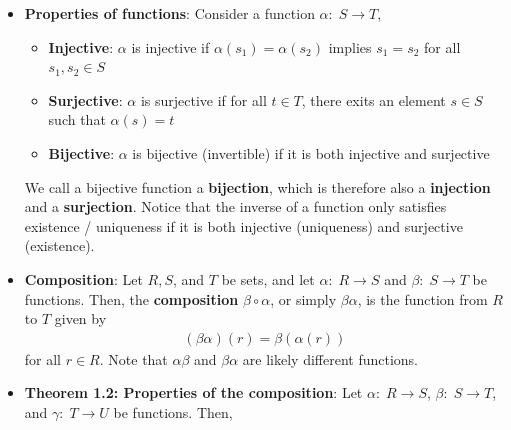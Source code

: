 \documentclass{report}
\begin{document}
\begin{itemize}
\begin{enumerate}
                    \begin{align*}
                        \forall a \in A,\; \exists b \in B \; : \; (a,b) \in f
                    .\end{align*}
                \item \textbf{Uniqueness / well-definedness}: Each input in $A$ has exactly one output in $B$
                    \begin{align*}
                        \forall a \in A,\; \forall b_{1}, b_{2} \in B,\; ((a,b_{1}) \in f \land (a,b_{2}) \in f) \implies b_{1} = b_{2}
                    .\end{align*}
            \end{enumerate}
        \item \textbf{Properties of functions}: Consider a function $\alpha:\; S \to T$, 
            \begin{itemize}
                \item \textbf{Injective}: $\alpha$ is injective if $\alpha(s_{1}) = \alpha(s_{2}) $ implies $s_{1} = s_{2} $ for all $s_{1}, s_{2} \in S $
                \item \textbf{Surjective}: $\alpha$ is surjective if for all $t \in T$, there exits an element $s \in S$ such that $\alpha(s) = t $
                \item \textbf{Bijective}: $\alpha$ is bijective (invertible) if it is both injective and surjective
            \end{itemize}
            We call a bijective function a \textbf{bijection}, which is therefore also a \textbf{injection} and a \textbf{surjection}.
            \bigbreak \noindent 
            Notice that the inverse of a function only satisfies existence / uniqueness if it is both injective (uniqueness) and surjective (existence).
        \item \textbf{Composition}: Let $R, S$, and $T$ be sets, and let $\alpha:\; R \to S$ and $\beta:\; S \to T$ be functions. Then, the \textbf{composition} $\beta \circ \alpha$, or simply $\beta \alpha$, is the function from $R$ to $T$ given by
            \begin{align*}
                (\beta \alpha)(r) = \beta(\alpha(r))
            \end{align*}
            for all $r \in R$. Note that $\alpha \beta$ and $\beta \alpha$ are likely different functions.
        \item \textbf{Theorem 1.2: Properties of the composition}: Let $\alpha:\; R \to S$, $\beta:\; S \to T$, and $\gamma:\; T \to U$ be functions. Then,

\end{itemize}
\end{document}
